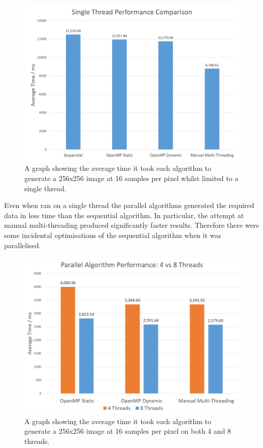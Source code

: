 \documentclass[12pt,journal,transmag]{IEEEtran}
\begin{document}
	\begin{figure}[!h]
		\centering
		\includegraphics[width=\columnwidth]{IMAGES/singlethreadperformance}
		\caption{A graph showing the average time it took each algorithm to generate a 256x256 image at 16 samples per pixel whilst limited to a single thread.}
		\label{graph3}
	\end{figure}

	Even when ran on a single thread the parallel algorithms generated the required data in less time than the sequential algorithm. In particular, the attempt at manual multi-threading produced significantly faster results. Therefore there were some incidental optimisations of the sequential algorithm when it was parallelised.

	\begin{figure}[!h]
		\centering
		\includegraphics[width=\columnwidth]{IMAGES/threadcomparison}
		\caption{A graph showing the average time it took each algorithm to generate a 256x256 image at 16 samples per pixel on both 4 and 8 threads.}
		\label{graph4}
	\end{figure}
\end{document}
